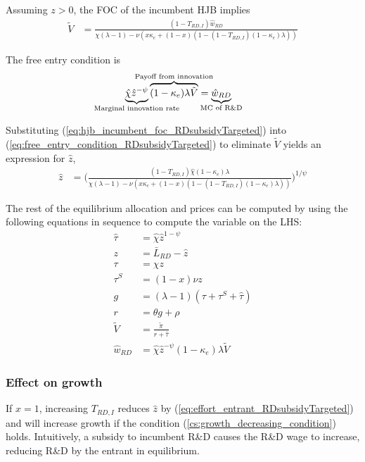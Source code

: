 \documentclass[11pt,english]{article}
\theoremstyle{remark}
\begin{document}
Assuming $z > 0$, the FOC of the incumbent HJB implies
\begin{align}
\tilde{V} &= \frac{(1-T_{RD,I})\hat{w}_{RD}}{\chi(\lambda -1) - \nu (x\kappa_c + (1-x)(1 - (1-T_{RD,I})(1-\kappa_e)\lambda)) } \label{eq:hjb_incumbent_foc_RDsubsidyTargeted}
\end{align}

The free entry condition is
\begin{align}
\underbrace{\hat{\chi} \hat{z}^{-\psi}}_{\mathclap{\text{Marginal innovation rate}}} \overbrace{(1-\kappa_e) \lambda \tilde{V}}^{\mathclap{\text{Payoff from innovation}}} &= \underbrace{\hat{w}_{RD}}_{\mathclap{\text{MC of R\&D}}} \label{eq:free_entry_condition_RDsubsidyTargeted}
\end{align}

Substituting (\ref{eq:hjb_incumbent_foc_RDsubsidyTargeted}) into (\ref{eq:free_entry_condition_RDsubsidyTargeted}) to eliminate $\tilde{V}$ yields an expression for $\hat{z}$, 
\begin{align}
\hat{z} &= \Bigg( \frac{(1-T_{RD,I})\hat{\chi} (1-\kappa_{e}) \lambda}{\chi(\lambda -1) - \nu (x\kappa_c + (1-x)(1 - (1-T_{RD,I})(1-\kappa_e)\lambda)) } \Bigg)^{1/\psi} \label{eq:effort_entrant_RDsubsidyTargeted}
\end{align}

The rest of the equilibrium allocation and prices can be computed by using the following equations in sequence to compute the variable on the LHS:
\begin{align}
\hat{\tau} &= \hat{\chi} \hat{z}^{1-\psi} \\
z &= \bar{L}_{RD} - \hat{z} \label{eq:labor_resource_constraint_RDsubsidyTargeted}\\ 
\tau &= \chi z \\
\tau^S &= (1-x) \nu z \\
g &= (\lambda - 1) (\tau + \tau^S + \hat{\tau}) \\
r &= \theta g + \rho \\
\tilde{V} &= \frac{\tilde{\pi}}{r + \hat{\tau}} \\ 
\hat{w}_{RD} &= \hat{\chi} \hat{z}^{-\psi} (1-\kappa_e) \lambda \tilde{V} \label{eq:wage_rd_labor_RDsubsidyTargeted}
\end{align}

\subsubsection{Effect on growth}

If $x = 1$, increasing $T_{RD,I}$ reduces $\hat{z}$ by (\ref{eq:effort_entrant_RDsubsidyTargeted}) and will increase growth if the condition (\ref{cs:growth_decreasing_condition}) holds. Intuitively, a subsidy to incumbent R\&D causes the R\&D wage to increase, reducing R\&D by the entrant in equilibrium. 
\end{document}
